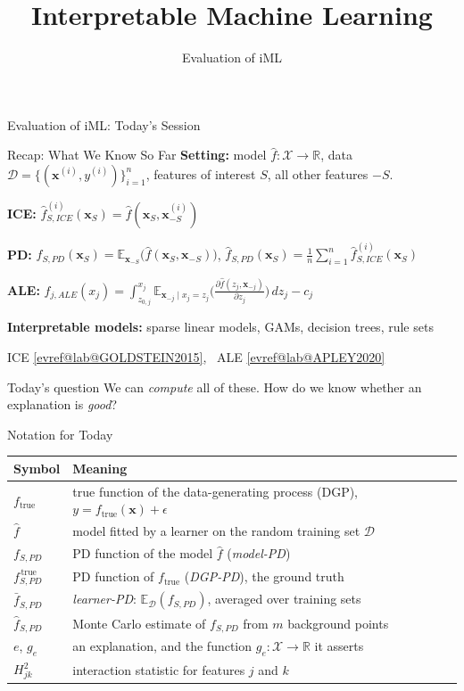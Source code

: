 \documentclass[10pt,compress,t,notes=noshow,xcolor=table]{beamer}
\title{Interpretable Machine Learning}
\subtitle{Evaluation of iML}
\date{}
\makeatletter
\newcommand{\spacer}[1][1]{\vspace{#1\baselineskip}}
\providecommand{\xv}{\mathbf{x}}
\providecommand{\fh}{\hat{f}}
\providecommand{\ftrue}{f_{\text{true}}}
\providecommand{\E}{\mathds{E}}
\providecommand{\D}{\mathcal{D}}
\providecommand{\Xspace}{\mathcal{X}}
\providecommand{\R}{\mathds{R}}
\renewcommand{\xi}[1][i]{\xv^{(#1)}}
\providecommand{\yi}[1][i]{y^{(#1)}}
\providecommand{\fhice}[1]{\fh_{#1,ICE}}
\newcommand{\fpdtrue}[1]{f^{\,\text{true}}_{#1,PD}}  %
\newcommand{\fpdbar}[1]{\bar{f}_{#1,PD}}             %
\newcommand{\citeref}[1]{%
  \href{\csname evref@url@#1\endcsname}{[\csname evref@lab@#1\endcsname]}}
\makeatother
\begin{document}

\begin{framev}[align=top]{Evaluation of iML: Today's Session}
\tableofcontents
\end{framev}


\begin{framev}[align=top]{Recap: What We Know So Far}
\textbf{Setting:} model $\fh: \Xspace \to \R$, data $\D = \{(\xi, \yi)\}_{i=1}^n$, features of interest $S$, all other features $-S$.
\spacer[0.5]
\begin{itemizeM}
\item \textbf{ICE:} $\fhice{S}^{(i)}(\xv_S) = \fh(\xv_S, \xv_{-S}^{(i)})$
\item \textbf{PD:} $f_{S,PD}(\xv_S) = \E_{\xv_{-S}}\big(\fh(\xv_S, \xv_{-S})\big)$, \quad
      $\fh_{S,PD}(\xv_S) = \frac{1}{n}\sum_{i=1}^n \fhice{S}^{(i)}(\xv_S)$
\item \textbf{ALE:} $f_{j,ALE}(x_j) = \displaystyle\int_{z_{0,j}}^{x_j} \E_{\xv_{-j}\mid x_j = z_j}\Big(\frac{\partial \fh(z_j, \xv_{-j})}{\partial z_j}\Big)\, dz_j - c_j$
\item \textbf{Interpretable models:} sparse linear models, GAMs, decision trees, rule sets
\end{itemizeM}
{\scriptsize ICE \citeref{GOLDSTEIN2015}, \ ALE \citeref{APLEY2020}\par}
\pause
\spacer[0.5]
\begin{block}{Today's question}
We can \emph{compute} all of these. How do we know whether an explanation is \emph{good}?
\end{block}
\end{framev}


\begin{framev}[align=top]{Notation for Today}
\small
\renewcommand{\arraystretch}{1.25}
\begin{tabular}{@{}>{\raggedright\arraybackslash}p{}>{\raggedright\arraybackslash}p{}@{}}
\toprule
Symbol & Meaning \\
\midrule
$\ftrue$ & true function of the data-generating process (DGP), $y = \ftrue(\xv) + \epsilon$ \\
$\fh$ & model fitted by a learner on the random training set $\D$ \\
$f_{S,PD}$ & PD function of the model $\fh$ (\emph{model-PD}) \\
$\fpdtrue{S}$ & PD function of $\ftrue$ (\emph{DGP-PD}), the ground truth \\
$\fpdbar{S}$ & \emph{learner-PD}: $\E_{\D}(f_{S,PD})$, averaged over training sets \\
$\fh_{S,PD}$ & Monte Carlo estimate of $f_{S,PD}$ from $m$ background points \\
$e$, $g_e$ & an explanation, and the function $g_e: \Xspace \to \R$ it asserts \\
$H^2_{jk}$ & interaction statistic for features $j$ and $k$ \\
\bottomrule
\end{tabular}
\end{framev}
\end{document}
